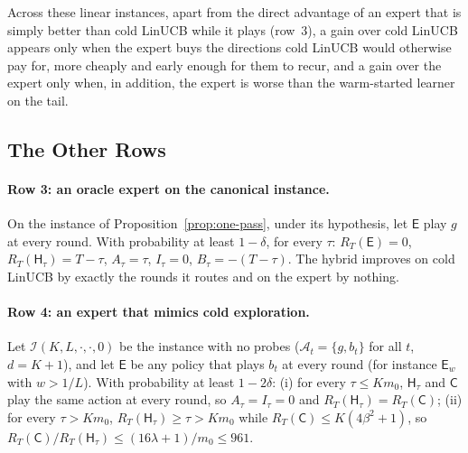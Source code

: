 \documentclass[anon]{alt2027} %
\newcommand{\Cold}{\mathsf{C}}
\newcommand{\Exp}{\mathsf{E}}
\newcommand{\Hyb}{\mathsf{H}}
\begin{document}
Across these linear instances, apart from the direct advantage of an expert
that is simply better than cold LinUCB while it plays (row~3), a gain over
cold LinUCB appears only when the expert buys the directions cold LinUCB would
otherwise pay for, more cheaply and early enough for them to recur, and a
gain over the expert only when, in addition, the expert is worse than the
warm-started learner on the tail.

\subsection{The Other Rows}
\label{app:catalog-rows}

\paragraph{Row 3: an oracle expert on the canonical instance.}
\begin{corollary}
\label{cor:cat-oracle}
On the instance of Proposition~\ref{prop:one-pass}, under its hypothesis, let
$\Exp$ play $g$ at every round. With probability at least $1-\delta$, for every
$\tau$: $R_T(\Exp)=0$, $R_T(\Hyb_\tau)=T-\tau$, $A_\tau=\tau$, $I_\tau=0$,
$B_\tau=-(T-\tau)$. The hybrid improves on cold LinUCB by exactly the rounds
it routes and on the expert by nothing.
\end{corollary}

\paragraph{Row 4: an expert that mimics cold exploration.}
\begin{proposition}
\label{prop:cat-mimic}
Let $\mathcal I(K,L,\cdot,\cdot,0)$ be the instance with no probes
($\mathcal A_t=\{g,b_t\}$ for all $t$, $d=K+1$), and let $\Exp$ be any policy
that plays $b_t$ at every round (for instance $\Exp_w$ with $w>1/L$). With
probability at least $1-2\delta$: (i) for every $\tau\le Km_0$,
$\Hyb_\tau$ and $\Cold$ play the same action at every round, so
$A_\tau=I_\tau=0$ and $R_T(\Hyb_\tau)=R_T(\Cold)$; (ii) for every
$\tau>Km_0$, $R_T(\Hyb_\tau)\ge\tau>Km_0$ while $R_T(\Cold)\le K(4\beta^2+1)$,
so $R_T(\Cold)/R_T(\Hyb_\tau)\le(16\lambda+1)/m_0\le961$.
\end{proposition}
\end{document}
